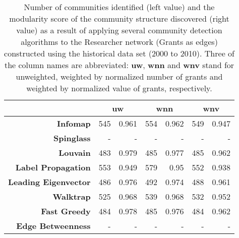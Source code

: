 \begin{table}[!htbp]
\centering
\caption[Number of communities and modularity score of community structure identified within the Researcher network (Grants as edges) constructed using the historical data set (2000 to 2010)]{Number of communities identified (left value) and the modularity score of the community structure discovered (right value) as a result of applying several community detection algorithms to the Researcher network (Grants as edges) constructed using the historical data set (2000 to 2010). Three of the column names are abbreviated: \textbf{uw}, \textbf{wnn} and \textbf{wnv} stand for unweighted, weighted by normalized number of grants and weighted by normalized value of grants, respectively.}
\label{table:researcher_b_past1_modularity_appendix}
\begin{tabular}{r|rr|rr|rr}
\textbf{} & \multicolumn{2}{c|}{\textbf{uw}} & \multicolumn{2}{c|}{\textbf{wnn}} & \multicolumn{2}{c}{\textbf{wnv}}\\
\hline
\textbf{Infomap} & {545} & {0.961} & {554} & {0.962} & {549} & {0.947}\\
\textbf{Spinglass} & {-} & {-} & {-} & {-} & {-} & {-}\\
\textbf{Louvain} & {483} & {0.979} & {485} & {0.977} & {485} & {0.962}\\
\textbf{Label Propagation} & {553} & {0.949} & {579} & {0.95} & {552} & {0.938}\\
\textbf{Leading Eigenvector} & {486} & {0.976} & {492} & {0.974} & {488} & {0.961}\\
\textbf{Walktrap} & {525} & {0.968} & {539} & {0.968} & {532} & {0.952}\\
\textbf{Fast Greedy} & {484} & {0.978} & {485} & {0.976} & {484} & {0.962}\\
\textbf{Edge Betweenness} & {-} & {-} & {-} & {-} & {-} & {-}
\end{tabular}
\end{table}

